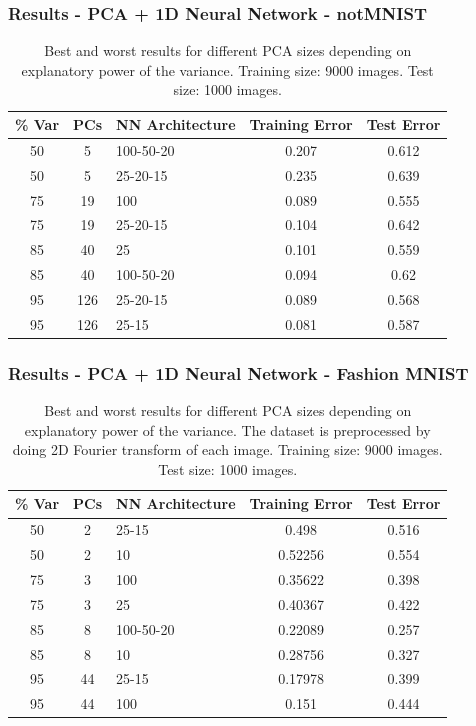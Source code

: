 \documentclass{beamer}
\begin{document}
\begin{frame}
\frametitle{Results - PCA + 1D Neural Network - notMNIST}
\begin{table}[hbt]
  \begin{tabular}{|cc|l|c|c|}
  	\hline
    \% Var & PCs & NN Architecture & Training Error & Test Error \\
    \hline
    \hline
    50 & 5 & 100-50-20 & 0.207    & 0.612\\
    50& 5 & 25-20-15 & 0.235    & 0.639\\
    \hline
    75 & 19 &  100 & 0.089    & 0.555\\
    75 & 19& 25-20-15 & 0.104    & 0.642\\
    \hline
    85 & 40 & 25 & 0.101   &  0.559\\
    85 & 40 & 100-50-20 & 0.094     & 0.62\\
    \hline
    95 & 126 & 25-20-15 & 0.089   &  0.568\\
    95 & 126 & 25-15 & 0.081   &  0.587\\
    \hline
  \end{tabular}
    \vspace{1em}
  \caption{Best and worst results for different PCA sizes depending on explanatory power of the variance. Training size: 9000 images. Test size: 1000 images.}
\end{table}
\end{frame}

\begin{frame}
\frametitle{Results - PCA + 1D Neural Network - Fashion MNIST}
\begin{table}[hbt]
  \begin{tabular}{|cc|l|c|c|}
  	\hline
    \% Var & PCs & NN Architecture & Training Error & Test Error \\
    \hline
    \hline
    50 &2 & 25-15 & 0.498     & 0.516\\
    50 & 2 & 10 & 0.52256     & 0.554\\
    \hline
    75 & 3 & 100 & 0.35622    &  0.398\\
    75 & 3 & 25 & 0.40367   &   0.422\\
    \hline
    85 & 8 & 100-50-20 & 0.22089    &  0.257\\
    85 & 8 & 10 & 0.28756    &  0.327\\
    \hline
    95 & 44 & 25-15 & 0.17978    &  0.399 \\
    95 & 44 & 100 & 0.151   &   0.444\\
    \hline
  \end{tabular}
    \vspace{1em}
  \caption{Best and worst results for different PCA sizes depending on explanatory power of the variance. The dataset is preprocessed by doing 2D Fourier transform of each image. Training size: 9000 images. Test size: 1000 images.}
\end{table}
\end{frame}
\end{document}
